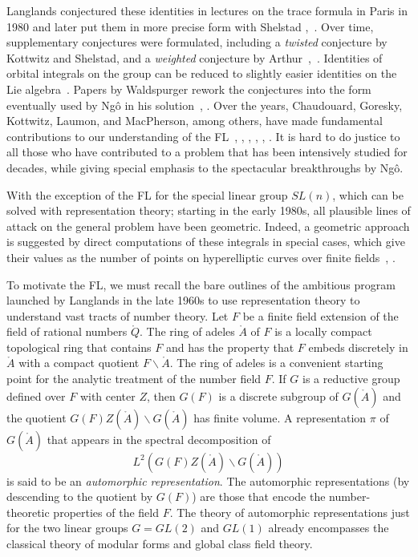 Langlands conjectured these identities in lectures on the trace
formula in Paris in 1980 and later put them in more precise form with
Shelstad \cite{Langlands:debuts},~\cite{LS:1987}.  Over time,
supplementary conjectures were formulated, including a {\it twisted}
conjecture by Kottwitz and Shelstad, and a {\it weighted} conjecture
by Arthur~\cite{KS:1999},~\cite{Arthur:2002}.  Identities of orbital
integrals on the group can be reduced to slightly easier identities on
the Lie algebra~\cite{LS:1990}.  Papers by Waldspurger rework the
conjectures into the form eventually used by Ng\^o in his
solution~\cite{Wald:2008}, \cite{Wald:1991}.  Over the years,
Chaudouard, Goresky, Kottwitz, Laumon, and MacPherson, among others,
have made fundamental contributions to our understanding of the
FL~\cite{LN:08}, \cite{GKM:2004}, \cite{GKM:2006}, \cite{CL:2009:I},
\cite{CL:2009:II}, \cite{CHL:2010}.  It is hard to do justice to all
those who have contributed to a problem that has been intensively
studied for decades, while giving special emphasis to the spectacular
breakthroughs by Ng\^o.


With the exception of the FL for the special linear group $SL(n)$,
which can be solved with representation theory; starting in the early
1980s, all plausible lines of attack on the general problem have been
geometric.  Indeed, a geometric approach is suggested by direct 
computations of these integrals in special cases, which
give their values as the number of points on hyperelliptic curves
over finite fields~\cite{KL:1988}, \cite{Hales:hyperelliptic}.

To motivate the FL, we must recall the bare outlines of the ambitious
program launched by Langlands in the late 1960s to use representation
theory to understand vast tracts of number theory.  Let $F$ be a
finite field extension of the field of rational numbers $\ring{Q}$.
The ring of adeles $\ring{A}$ of $F$ is a locally compact topological
ring that contains $F$ and has the property that $F$ embeds discretely
in $\ring{A}$ with a compact quotient $F\backslash\ring{A}$.  The ring
of adeles is a convenient starting point for the analytic treatment of
the number field $F$.  If $G$ is a reductive group defined over $F$
with center $Z$, then $G(F)$ is a discrete subgroup of $G(\ring{A})$
and the quotient $G(F)Z(\ring{A})\backslash G(\ring{A})$ has finite
volume.  A representation $\pi$ of $G(\ring{A})$ that appears in the
spectral decomposition of
\[
L^2(G(F)Z(\ring{A})\backslash G(\ring{A}))
\]
is said to be an {\it automorphic representation}.  The automorphic
representations (by descending to the quotient by $G(F)$) are those
that encode the number-theoretic properties of the field $F$.
The theory of automorphic representations just for the two linear
groups $G=GL(2)$ and $GL(1)$ already 
encompasses the classical theory
of modular forms and global class field theory.

